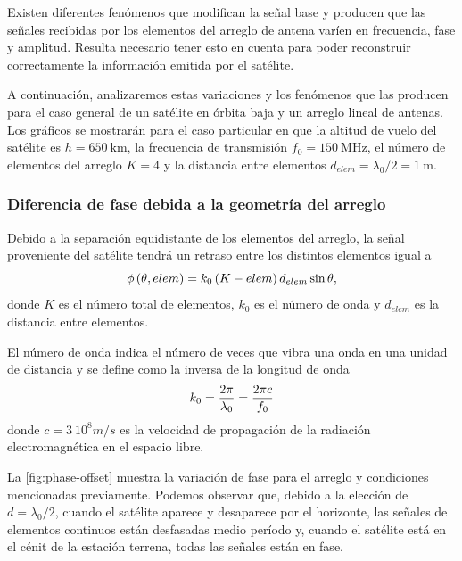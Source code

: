 \documentclass{article}
\newenvironment{standalone}{\begin{preview}}{\end{preview}}
\begin{document}
\begin{standalone}
  Existen diferentes fenómenos que modifican la señal base y producen que las señales recibidas por los elementos del arreglo de antena varíen en frecuencia, fase y amplitud.
  Resulta necesario tener esto en cuenta para poder reconstruir correctamente la información emitida por el satélite.

  A continuación, analizaremos estas variaciones y los fenómenos que las producen para el caso general de un satélite en órbita baja y un arreglo lineal de antenas. Los gráficos se mostrarán para el caso particular en que la altitud de vuelo del satélite es $h = 650 \ \si{\kilo\meter}$, la frecuencia de transmisión $f_0 = 150 \ \si{\mega\hertz}$, el número de elementos del arreglo $K = 4$ y la distancia entre elementos $d_{elem} = \lambda_0 / 2 = 1 \ \si{\meter}$.

  \subsubsection{Diferencia de fase debida a la geometría del arreglo}

  Debido a la separación equidistante de los elementos del arreglo, la señal proveniente del satélite tendrá un retraso entre los distintos elementos igual a \cite[126]{visser2005}
  \begin{equation}
    \phi \left( \theta, elem \right) = k_0 \left( K - elem \right) d_{elem} \sin{\theta},
    \tagaddtext{[\si{\radian}]}
  \end{equation}
  donde $K$ es el número total de elementos, $k_0$ es el número de onda y $d_{elem}$ es la distancia entre elementos.

  El número de onda indica el número de veces que vibra una onda en una unidad de distancia y se define como la inversa de la longitud de onda
  \begin{equation}
    k_0 = \frac{2\pi}{\lambda_{0}} = \frac{2\pi c}{f_0}
    \tagaddtext{[\si{\radian\per\meter}]}
  \end{equation}
  donde $c = 3 \ 10^8 m/s$ es la velocidad de propagación de la radiación electromagnética en el espacio libre.

  La \cref{fig:phase-offset} muestra la variación de fase para el arreglo y condiciones mencionadas previamente. Podemos observar que, debido a la elección de $d = \lambda_0 / 2$, cuando el satélite aparece y desaparece por el horizonte, las señales de elementos continuos están desfasadas medio período y, cuando el satélite está en el cénit de la estación terrena, todas las señales están en fase.


\end{standalone}
\end{document}
